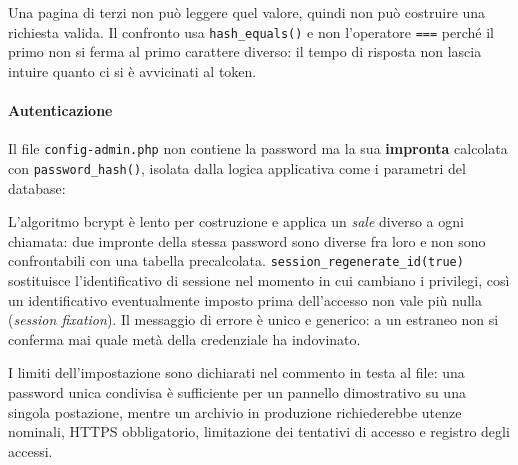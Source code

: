 \documentclass[
  11pt,
]{article}
\newenvironment{Shaded}{\begin{snugshade}}{\end{snugshade}}
\newcommand{\ControlFlowTok}[1]{\textcolor[rgb]{0.13,0.29,0.53}{\textbf{#1}}}
\newcommand{\FunctionTok}[1]{\textcolor[rgb]{0.13,0.29,0.53}{\textbf{#1}}}
\newcommand{\KeywordTok}[1]{\textcolor[rgb]{0.13,0.29,0.53}{\textbf{#1}}}
\newcommand{\NormalTok}[1]{#1}
\newcommand{\OperatorTok}[1]{\textcolor[rgb]{0.81,0.36,0.00}{\textbf{#1}}}
\newcommand{\OtherTok}[1]{\textcolor[rgb]{0.56,0.35,0.01}{#1}}
\newcommand{\StringTok}[1]{\textcolor[rgb]{0.31,0.60,0.02}{#1}}
\newcommand{\VariableTok}[1]{\textcolor[rgb]{0.00,0.00,0.00}{#1}}
\begin{document}
Una pagina di terzi non può leggere quel valore, quindi non può
costruire una richiesta valida. Il confronto usa \texttt{hash\_equals()}
e non l'operatore \texttt{===} perché il primo non si ferma al primo
carattere diverso: il tempo di risposta non lascia intuire quanto ci si
è avvicinati al token.

\hypertarget{autenticazione}{%
\paragraph{Autenticazione}\label{autenticazione}}

Il file \texttt{config-admin.php} non contiene la password ma la sua
\textbf{impronta} calcolata con \texttt{password\_hash()}, isolata dalla
logica applicativa come i parametri del database:

\begin{Shaded}
\end{Shaded}

L'algoritmo bcrypt è lento per costruzione e applica un \emph{sale}
diverso a ogni chiamata: due impronte della stessa password sono diverse
fra loro e non sono confrontabili con una tabella precalcolata.
\texttt{session\_regenerate\_id(true)} sostituisce l'identificativo di
sessione nel momento in cui cambiano i privilegi, così un identificativo
eventualmente imposto prima dell'accesso non vale più nulla
(\emph{session fixation}). Il messaggio di errore è unico e generico: a
un estraneo non si conferma mai quale metà della credenziale ha
indovinato.

I limiti dell'impostazione sono dichiarati nel commento in testa al
file: una password unica condivisa è sufficiente per un pannello
dimostrativo su una singola postazione, mentre un archivio in produzione
richiederebbe utenze nominali, HTTPS obbligatorio, limitazione dei
tentativi di accesso e registro degli accessi.
\end{document}
